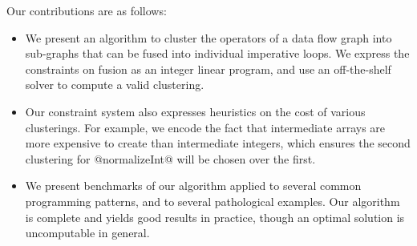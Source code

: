 Our contributions are as follows:

\begin{itemize}
\item   We present an algorithm to cluster the operators of a data flow graph into sub-graphs that can be fused into individual imperative loops. We express the constraints on fusion as an integer linear program, and use an off-the-shelf solver to compute a valid clustering. 

\item   Our constraint system also expresses heuristics on the cost of various clusterings. For example, we encode the fact that intermediate arrays are more expensive to create than intermediate integers, which ensures the second clustering for @normalizeInt@ will be chosen over the first. 

\item   We present benchmarks of our algorithm applied to several common programming patterns, and to several pathological examples. Our algorithm is complete and yields good results in practice, though an optimal solution is uncomputable in general. 
\end{itemize}






